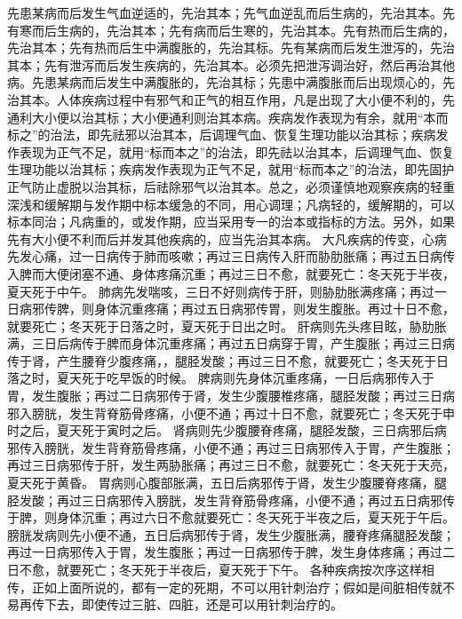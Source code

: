 \documentclass[a4paper,12pt,UTF8,twoside]{ctexbook}
\begin{document}
先患某病而后发生气血逆适的，先治其本；先气血逆乱而后生病的，先治其本。先有寒而后生病的，先治其本；先有病而后生寒的，先治其本。先有热而后生病的，先治其本；先有热而后生中满腹胀的，先治其标。先有某病而后发生泄泻的，先治其本；先有泄泻而后发生疾病的，先治其本。必须先把泄泻调治好，然后再治其他病。先患某病而后发生中满腹胀的，先治其标；先患中满腹胀而后出现烦心的，先治其本。人体疾病过程中有邪气和正气的相互作用，凡是出现了大小便不利的，先通利大小便以治其标；大小便通利则治其本病。疾病发作表现为有余，就用“本而标之”的治法，即先祛邪以治其本，后调理气血、恢复生理功能以治其标；疾病发作表现为正气不足，就用“标而本之”的治法，即先祛以治其本，后调理气血、恢复生理功能以治其标；疾病发作表现为正气不足，就用“标而本之”的治法，即先固护正气防止虚脱以治其标，后祛除邪气以治其本。总之，必须谨慎地观察疾病的轻重深浅和缓解期与发作期中标本缓急的不同，用心调理；凡病轻的，缓解期的，可以标本同治；凡病重的，或发作期，应当采用专一的治本或指标的方法。另外，如果先有大小便不利而后并发其他疾病的，应当先治其本病。
大凡疾病的传变，心病先发心痛，过一日病传于肺而咳嗽；再过三日病传入肝而胁肋胀痛；再过五日病传入脾而大便闭塞不通、身体疼痛沉重；再过三日不愈，就要死亡：冬天死于半夜，夏天死于中午。
肺病先发喘咳，三日不好则病传于肝，则胁肋胀满疼痛；再过一日病邪传脾，则身体沉重疼痛；再过五日病邪传胃，则发生腹胀。再过十日不愈，就要死亡；冬天死于日落之时，夏天死于日出之时。
肝病则先头疼目眩，胁肋胀满，三日后病传于脾而身体沉重疼痛；再过五日病穿于胃，产生腹胀；再过三日病传于肾，产生腰脊少腹疼痛，，腿胫发酸；再过三日不愈，就要死亡；冬天死于日落之时，夏天死于吃早饭的时候。
脾病则先身体沉重疼痛，一日后病邪传入于胃，发生腹胀；再过二日病邪传于肾，发生少腹腰椎疼痛，腿胫发酸；再过三日病邪入膀胱，发生背脊筋骨疼痛，小便不通；再过十日不愈，就要死亡；冬天死于申时之后，夏天死于寅时之后。
肾病则先少腹腰脊疼痛，腿胫发酸，三日病邪后病邪传入膀胱，发生背脊筋骨疼痛，小便不通；再过三日病邪传入于胃，产生腹胀；再过三日病邪传于肝，发生两胁胀痛；再过三日不愈，就要死亡：冬天死于天亮，夏天死于黄昏。
胃病则心腹部胀满，五日后病邪传于肾，发生少腹腰脊疼痛，腿胫发酸；再过三日病邪传入膀胱，发生背脊筋骨疼痛，小便不通；再过五日病邪传于脾，则身体沉重；再过六日不愈就要死亡：冬天死于半夜之后，夏天死于午后。
膀胱发病则先小便不通，五日后病邪传于肾，发生少腹胀满，腰脊疼痛腿胫发酸；再过一日病邪传入于胃，发生腹胀；再过一日病邪传于脾，发生身体疼痛；再过二日不愈，就要死亡；冬天死于半夜后，夏天死于下午。
各种疾病按次序这样相传，正如上面所说的，都有一定的死期，不可以用针刺治疗；假如是间脏相传就不易再传下去，即使传过三脏、四脏，还是可以用针刺治疗的。

\part{}
\end{document}
